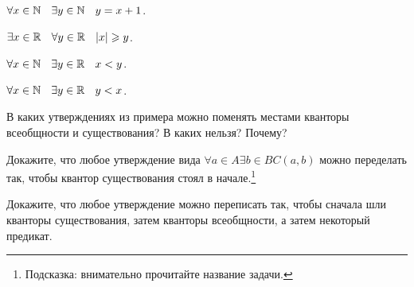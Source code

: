 \documentclass[a4paper, 12pt, num=24]{listok}
\begin{document}
\begin{example}
	\phantom{000}
	\begin{multienum}{2}
		\item $\forall{x \in \N} \exists{y \in \N} y = x + 1$.
		\item $\exists{x \in \R} \forall{y \in \R} |x| \ge y$.
		\item $\forall{x \in \N} \exists{y \in \R} x < y$.
		\item $\forall{x \in \N} \exists{y \in \R} y < x$.
	\end{multienum}
\end{example}
\begin{problem}
\begin{probparts}
	\item В каких утверждениях из примера можно поменять местами кванторы всеобщности и существования? В каких нельзя? Почему?
	\item Докажите, что любое утверждение вида $\forall{a \in A} \exists{b \in B} C(a, b)$ можно переделать так, чтобы квантор существования стоял в начале.\footnote{%
		Подсказка: внимательно прочитайте название задачи.}
	\item Докажите, что любое утверждение можно переписать так, чтобы сначала шли кванторы существования, затем кванторы всеобщности, а затем некоторый предикат.
\end{probparts}
\end{problem}
\end{document}
